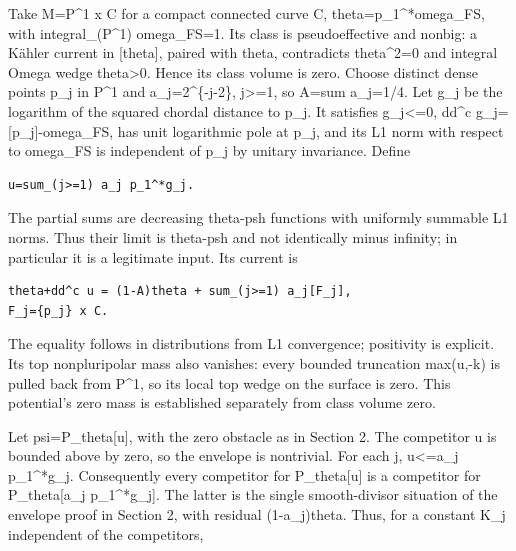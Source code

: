 \documentclass[11pt]{article}
\begin{document}
Take M=\allowbreak{}P\textasciicircum{}\allowbreak{}1 x C for a compact connected curve C, theta=\allowbreak{}p\_\allowbreak{}1\textasciicircum{}\allowbreak{}*omega\_\allowbreak{}FS, with integral\_\allowbreak{}(P\textasciicircum{}\allowbreak{}1) omega\_\allowbreak{}FS=\allowbreak{}1. Its class is pseudoeffective and nonbig: a Kähler current in [theta], paired with theta, contradicts theta\textasciicircum{}\allowbreak{}2=\allowbreak{}0 and integral Omega wedge theta>0. Hence its class volume is zero. Choose distinct dense points p\_\allowbreak{}j in P\textasciicircum{}\allowbreak{}1 and a\_\allowbreak{}j=\allowbreak{}2\textasciicircum{}\allowbreak{}\{-\allowbreak{}j-\allowbreak{}2\}, j>=\allowbreak{}1, so A=\allowbreak{}sum a\_\allowbreak{}j=\allowbreak{}1/\allowbreak{}4. Let g\_\allowbreak{}j be the logarithm of the squared chordal distance to p\_\allowbreak{}j. It satisfies g\_\allowbreak{}j<=\allowbreak{}0, dd\textasciicircum{}\allowbreak{}c g\_\allowbreak{}j=\allowbreak{}[p\_\allowbreak{}j]-\allowbreak{}omega\_\allowbreak{}FS, has unit logarithmic pole at p\_\allowbreak{}j, and its L1 norm with respect to omega\_\allowbreak{}FS is independent of p\_\allowbreak{}j by unitary invariance. Define

\begin{Verbatim}[breaklines=true,fontsize=\small]
u=sum_(j>=1) a_j p_1^*g_j.
\end{Verbatim}

The partial sums are decreasing theta-\allowbreak{}psh functions with uniformly summable L1 norms. Thus their limit is theta-\allowbreak{}psh and not identically minus infinity; in particular it is a legitimate input. Its current is

\begin{Verbatim}[breaklines=true,fontsize=\small]
theta+dd^c u = (1-A)theta + sum_(j>=1) a_j[F_j],
F_j={p_j} x C.
\end{Verbatim}

The equality follows in distributions from L1 convergence; positivity is explicit. Its top nonpluripolar mass also vanishes: every bounded truncation max(u,-\allowbreak{}k) is pulled back from P\textasciicircum{}\allowbreak{}1, so its local top wedge on the surface is zero. This potential's zero mass is established separately from class volume zero.

Let psi=\allowbreak{}P\_\allowbreak{}theta[u], with the zero obstacle as in Section 2. The competitor u is bounded above by zero, so the envelope is nontrivial. For each j, u<=\allowbreak{}a\_\allowbreak{}j p\_\allowbreak{}1\textasciicircum{}\allowbreak{}*g\_\allowbreak{}j. Consequently every competitor for P\_\allowbreak{}theta[u] is a competitor for P\_\allowbreak{}theta[a\_\allowbreak{}j p\_\allowbreak{}1\textasciicircum{}\allowbreak{}*g\_\allowbreak{}j]. The latter is the single smooth-\allowbreak{}divisor situation of the envelope proof in Section 2, with residual (1-\allowbreak{}a\_\allowbreak{}j)theta. Thus, for a constant K\_\allowbreak{}j independent of the competitors,
\end{document}
